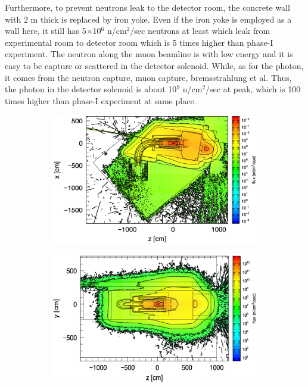 Furthermore, to prevent neutrons leak to the detector room, the concrete wall with 2 m thick is replaced by iron yoke.
Even if the iron yoke is employed as a wall here, it still has 5$\times$10$^6$ n/cm$^2$/sec neutrons at least which leak from experimental room to detector room which is 5 times higher than phase-I experiment.
The neutron along the muon beamline is with low energy and it is easy to be capture or scattered in the detector solenoid.
While, as for the photon, it comes from the neutron capture, muon capture, bremsstrahlung et al.
Thus, the photon in the detector solenoid is about 10$^9$ n/cm$^2$/sec at peak, which is 100 times higher than phase-I experiment at same place.
\begin{figure}[H]
   \begin{subfigure}{0.3\textwidth}
    \centering
    \includegraphics[scale=0.32]{chapter3/fig/neutronzx.pdf}
   \end{subfigure}
   \hspace{0.2\textwidth}
   \begin{subfigure}{0.3\textwidth}
    \centering
	\includegraphics[scale=0.32]{chapter3/fig/neutronzy.pdf}
   \end{subfigure}
  \end{figure}
